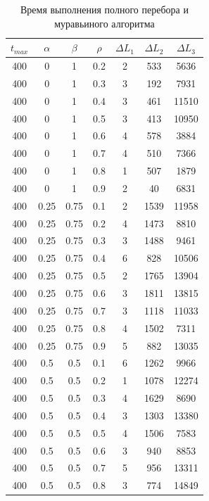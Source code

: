 \documentclass[12pt]{report}
\begin{document}
	\begin{table}[H]
		\begin{center}
			\caption[]{\label{tbl:only11} Время выполнения полного перебора и муравьиного алгоритма}
			\begin{tabular}{|c|c|c|c|c|c|c|}
				\hline
				$t_{max}$ & $\alpha$ & $\beta$ & $\rho$ & $\Delta L_{1}$ & $\Delta L_{2}$ & $\Delta L_{3}$\\
				\hline			
				400 & 0 & 1 & 0.2 & 2 & 533 & 5636 \\
				400 & 0 & 1 & 0.3 & 3 & 192 & 7931 \\
				400 & 0 & 1 & 0.4 & 3 & 461 & 11510 \\
				400 & 0 & 1 & 0.5 & 3 & 413 & 10950 \\
				400 & 0 & 1 & 0.6 & 4 & 578 & 3884 \\
				400 & 0 & 1 & 0.7 & 4 & 510 & 7366 \\
				400 & 0 & 1 & 0.8 & 1 & 507 & 1879 \\
				400 & 0 & 1 & 0.9 & 2 & 40 & 6831 \\
				400 & 0.25 & 0.75 & 0.1 & 2 & 1539 & 11958 \\
				400 & 0.25 & 0.75 & 0.2 & 4 & 1473 & 8810 \\
				400 & 0.25 & 0.75 & 0.3 & 3 & 1488 & 9461 \\
				400 & 0.25 & 0.75 & 0.4 & 6 & 828 & 10506 \\
				400 & 0.25 & 0.75 & 0.5 & 2 & 1765 & 13904 \\
				400 & 0.25 & 0.75 & 0.6 & 3 & 1811 & 13815 \\
				400 & 0.25 & 0.75 & 0.7 & 3 & 1118 & 11033 \\
				400 & 0.25 & 0.75 & 0.8 & 4 & 1502 & 7311 \\
				400 & 0.25 & 0.75 & 0.9 & 5 & 882 & 13035 \\
				400 & 0.5 & 0.5 & 0.1 & 6 & 1262 & 9966 \\
				400 & 0.5 & 0.5 & 0.2 & 1 & 1078 & 12274 \\
				400 & 0.5 & 0.5 & 0.3 & 4 & 1629 & 8690 \\
				400 & 0.5 & 0.5 & 0.4 & 3 & 1303 & 13380 \\
				400 & 0.5 & 0.5 & 0.5 & 4 & 1506 & 7583 \\
				400 & 0.5 & 0.5 & 0.6 & 3 & 940 & 8853 \\
				400 & 0.5 & 0.5 & 0.7 & 5 & 956 & 13311 \\
				400 & 0.5 & 0.5 & 0.8 & 3 & 774 & 14849 \\

\end{tabular}
\end{center}
\end{table}
\end{document}
